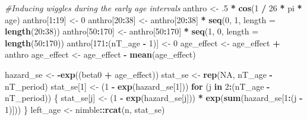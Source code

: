 \documentclass[11pt,]{article}
\newenvironment{Shaded}{\begin{snugshade}}{\end{snugshade}}
\newcommand{\KeywordTok}[1]{\textcolor[rgb]{0.13,0.29,0.53}{\textbf{#1}}}
\newcommand{\DataTypeTok}[1]{\textcolor[rgb]{0.13,0.29,0.53}{#1}}
\newcommand{\DecValTok}[1]{\textcolor[rgb]{0.00,0.00,0.81}{#1}}
\newcommand{\StringTok}[1]{\textcolor[rgb]{0.31,0.60,0.02}{#1}}
\newcommand{\CommentTok}[1]{\textcolor[rgb]{0.56,0.35,0.01}{\textit{#1}}}
\newcommand{\OtherTok}[1]{\textcolor[rgb]{0.56,0.35,0.01}{#1}}
\newcommand{\ControlFlowTok}[1]{\textcolor[rgb]{0.13,0.29,0.53}{\textbf{#1}}}
\newcommand{\OperatorTok}[1]{\textcolor[rgb]{0.81,0.36,0.00}{\textbf{#1}}}
\newcommand{\NormalTok}[1]{#1}
\begin{document}
\begin{Shaded}
\begin{Highlighting}[]
  \CommentTok{#Inducing wiggles during the early age intervals}
\NormalTok{  anthro <-}\StringTok{ }\NormalTok{.}\DecValTok{5} \OperatorTok{*}\StringTok{ }\KeywordTok{cos}\NormalTok{(}\DecValTok{1} \OperatorTok{/}\StringTok{ }\DecValTok{26} \OperatorTok{*}\StringTok{ }\NormalTok{pi }\OperatorTok{*}\StringTok{ }\NormalTok{age)}
\NormalTok{  anthro[}\DecValTok{1}\OperatorTok{:}\DecValTok{19}\NormalTok{] <-}\StringTok{ }\DecValTok{0}
\NormalTok{  anthro[}\DecValTok{20}\OperatorTok{:}\DecValTok{38}\NormalTok{] <-}\StringTok{ }\NormalTok{anthro[}\DecValTok{20}\OperatorTok{:}\DecValTok{38}\NormalTok{] }\OperatorTok{*}\StringTok{ }\KeywordTok{seq}\NormalTok{(}\DecValTok{0}\NormalTok{, }\DecValTok{1}\NormalTok{, }\DataTypeTok{length =} \KeywordTok{length}\NormalTok{(}\DecValTok{20}\OperatorTok{:}\DecValTok{38}\NormalTok{))}
\NormalTok{  anthro[}\DecValTok{50}\OperatorTok{:}\DecValTok{170}\NormalTok{] <-}\StringTok{ }\NormalTok{anthro[}\DecValTok{50}\OperatorTok{:}\DecValTok{170}\NormalTok{] }\OperatorTok{*}\StringTok{ }\KeywordTok{seq}\NormalTok{(}\DecValTok{1}\NormalTok{, }\DecValTok{0}\NormalTok{, }\DataTypeTok{length =} \KeywordTok{length}\NormalTok{(}\DecValTok{50}\OperatorTok{:}\DecValTok{170}\NormalTok{))}
\NormalTok{  anthro[}\DecValTok{171}\OperatorTok{:}\NormalTok{(nT_age }\OperatorTok{-}\StringTok{ }\DecValTok{1}\NormalTok{)] <-}\StringTok{ }\DecValTok{0} 
\NormalTok{  age_effect <-}\StringTok{ }\NormalTok{age_effect }\OperatorTok{+}\StringTok{ }\NormalTok{anthro}
\NormalTok{  age_effect <-}\StringTok{ }\NormalTok{age_effect }\OperatorTok{-}\StringTok{ }\KeywordTok{mean}\NormalTok{(age_effect)}

\NormalTok{  hazard_se <-}\StringTok{ }\OperatorTok{-}\KeywordTok{exp}\NormalTok{((beta0 }\OperatorTok{+}\StringTok{ }\NormalTok{age_effect))}
\NormalTok{  stat_se <-}\StringTok{ }\KeywordTok{rep}\NormalTok{(}\OtherTok{NA}\NormalTok{, nT_age }\OperatorTok{-}\StringTok{ }\NormalTok{nT_period)}
\NormalTok{  stat_se[}\DecValTok{1}\NormalTok{] <-}\StringTok{ }\NormalTok{(}\DecValTok{1} \OperatorTok{-}\StringTok{ }\KeywordTok{exp}\NormalTok{(hazard_se[}\DecValTok{1}\NormalTok{]))}
  \ControlFlowTok{for}\NormalTok{ (j }\ControlFlowTok{in} \DecValTok{2}\OperatorTok{:}\NormalTok{(nT_age }\OperatorTok{-}\StringTok{ }\NormalTok{nT_period)) \{}
\NormalTok{    stat_se[j] <-}\StringTok{ }\NormalTok{(}\DecValTok{1} \OperatorTok{-}\StringTok{ }\KeywordTok{exp}\NormalTok{(hazard_se[j])) }\OperatorTok{*}\StringTok{ }\KeywordTok{exp}\NormalTok{(}\KeywordTok{sum}\NormalTok{(hazard_se[}\DecValTok{1}\OperatorTok{:}\NormalTok{(j }\OperatorTok{-}\StringTok{ }\DecValTok{1}\NormalTok{)]))}
\NormalTok{  \}}
\NormalTok{  left_age <-}\StringTok{ }\NormalTok{nimble}\OperatorTok{::}\KeywordTok{rcat}\NormalTok{(n, stat_se)}


\end{Highlighting}
\end{Shaded}
\end{document}
